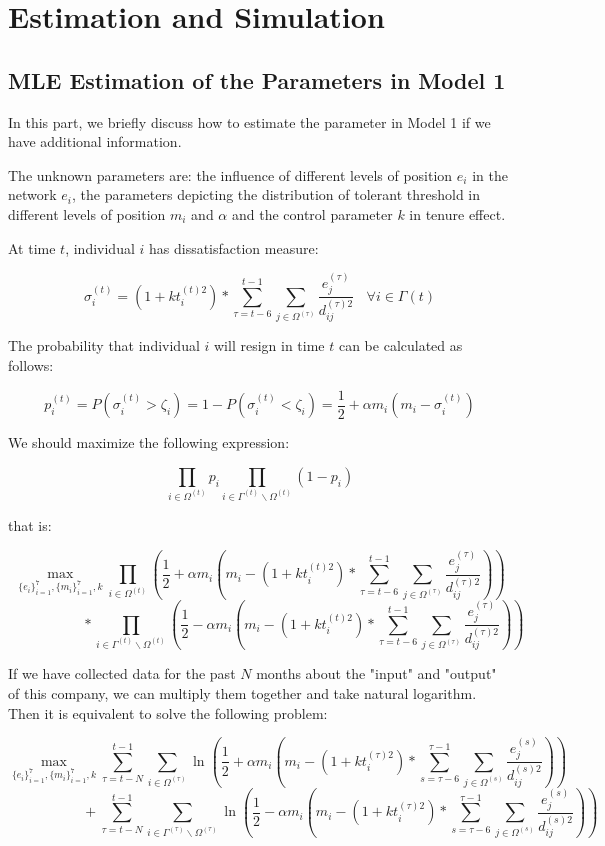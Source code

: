 \documentclass[tcn = 37075, sheet = true, abstract = true]{mcmthesis}
\begin{document}
\section{Estimation and Simulation}

\subsection{MLE Estimation of the Parameters in Model 1}

In this part, we briefly discuss how to estimate the parameter in Model 1 if we have additional information.

The unknown parameters are: the influence of different levels of position $e_i$ in the network $e_i$, the parameters depicting the distribution of tolerant threshold in different levels of position $m_i$ and $\alpha$ and the control parameter $k$ in tenure effect.

At time $t$, individual $i$ has dissatisfaction measure:

$$\displaystyle \sigma_i^{(t)}=(1+kt_i^{(t)2})*\sum_{\tau=t-6}^{t-1}\sum_{j\in \Omega^{(\tau)}}\frac{e_j^{(\tau)}}{d_{ij}^{(\tau)2}}~~~~\forall i\in \Gamma{(t)}
$$

The probability that individual $i$ will resign in time $t$ can be calculated as follows:

$$\displaystyle p_i^{(t)}=P(\sigma_i^{(t)}>\zeta_i)=1-P(\sigma_i^{(t)}<\zeta_i)=\frac{1}{2}+\alpha m_i(m_i-\sigma_i^{(t)})$$

We should maximize the following expression:

$$\prod\limits_{i \in \Omega^{(t)}} p_i \prod_{i\in \Gamma^{(t)}\backslash \Omega^{(t)}}(1-p_i)$$

that is:

$$\max \limits_{\{e_i\}_{i=1}^7,\{m_i\}_{i=1}^7,k} \prod_{i \in \Omega^{(t)}} (\frac{1}{2}+\alpha m_i(m_i-(1+kt_i^{(t)2})*\sum_{\tau=t-6}^{t-1}\sum_{j\in \Omega^{(\tau)}}\frac{e_j^{(\tau)}}{d_{ij}^{(\tau)2}}) ) $$ 
$$~~~~~~~~~~~~~~~~~~~~~~~~*\prod_{i\in \Gamma^{(t)}\backslash \Omega^{(t)}}(\frac{1}{2}-\alpha m_i(m_i-(1+kt_i^{(t)2})*\sum_{\tau=t-6}^{t-1}\sum_{j\in \Omega^{(\tau)}}\frac{e_j^{(\tau)}}{d_{ij}^{(\tau)2}}) ) $$

If we have collected data for the past $N$ months about the "input" and "output" of this company, we can multiply them together and take natural logarithm. Then it is equivalent to solve the following problem:

$$\max \limits_{\{e_i\}_{i=1}^7,\{m_i\}_{i=1}^7,k} \sum\limits_{\tau=t-N}^{t-1} \sum_{i \in \Omega^{(\tau)}} \ln (\frac{1}{2}+\alpha m_i(m_i-(1+kt_i^{(\tau)2})*\sum_{s=\tau-6}^{\tau-1}\sum_{j\in \Omega^{(s)}}\frac{e_j^{(s)}}{d_{ij}^{(s)2}} )) $$ 
$$~~~~~~~~~~~~~~~~~~~~~~~~+\sum\limits_{\tau=t-N}^{t-1} \sum\limits_{i \in \Gamma^{(\tau)} \backslash \Omega^{(\tau)}} \ln (\frac{1}{2}-\alpha m_i(m_i-(1+kt_i^{(\tau)2})*\sum_{s=\tau-6}^{\tau-1}\sum_{j\in \Omega^{(s)}}\frac{e_j^{(s)}}{d_{ij}^{(s)2}}) ) $$
\end{document}
